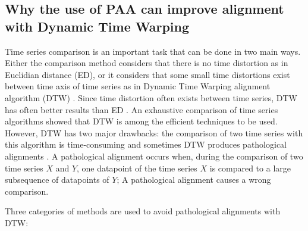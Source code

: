 \subsection{Why the use of PAA can improve alignment with Dynamic Time Warping}

 Time series comparison is an important task that
can be done in two main ways.
Either the comparison method  considers that there is no time distortion as in Euclidian distance
(ED), or it considers that  some small time distortions  exist between time axis of time series as
in Dynamic Time Warping alignment algorithm (DTW)
\cite{Zhang_Tang_Duan_2015}. Since time distortion often exists between time series, DTW  has often
better results than ED \cite{UCRArchive}. An exhaustive comparison of time series algorithms
\cite{Bagnall} showed that DTW is among the efficient techniques to be used. However, DTW has two major
drawbacks:
 the comparison of two time series with this algorithm is time-consuming
\cite{Rakthanmanon_Campana_Mueen_Batista_Westover_Zhu_Zakaria_Keogh_2012} and sometimes DTW
 produces pathological alignments \cite{Keogh_Pazzani_2001}. A
pathological alignment occurs when, during the comparison of two time  series $X$
and $Y$, one datapoint of the time series $X$ is compared to a large subsequence
of datapoints of $Y$;  A pathological alignment causes a wrong comparison.


 Three categories of methods are used to avoid pathological alignments with DTW:

